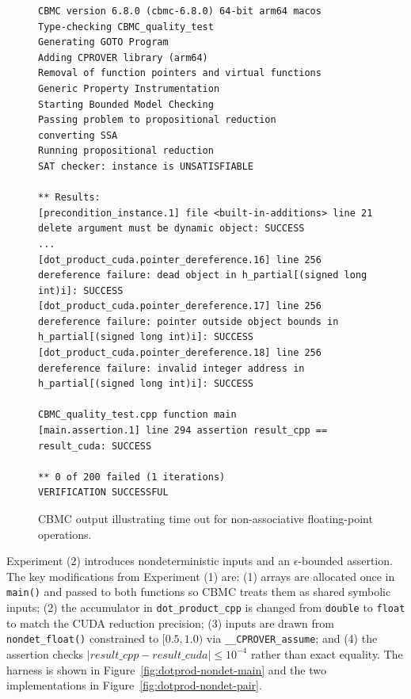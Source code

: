 \documentclass{article}
\begin{document}
\begin{figure}[H]
\begin{verbatim}
CBMC version 6.8.0 (cbmc-6.8.0) 64-bit arm64 macos
Type-checking CBMC_quality_test
Generating GOTO Program
Adding CPROVER library (arm64)
Removal of function pointers and virtual functions
Generic Property Instrumentation
Starting Bounded Model Checking
Passing problem to propositional reduction
converting SSA
Running propositional reduction
SAT checker: instance is UNSATISFIABLE

** Results:
[precondition_instance.1] file <built-in-additions> line 21 delete argument must be dynamic object: SUCCESS
...
[dot_product_cuda.pointer_dereference.16] line 256 dereference failure: dead object in h_partial[(signed long int)i]: SUCCESS
[dot_product_cuda.pointer_dereference.17] line 256 dereference failure: pointer outside object bounds in h_partial[(signed long int)i]: SUCCESS
[dot_product_cuda.pointer_dereference.18] line 256 dereference failure: invalid integer address in h_partial[(signed long int)i]: SUCCESS

CBMC_quality_test.cpp function main
[main.assertion.1] line 294 assertion result_cpp == result_cuda: SUCCESS

** 0 of 200 failed (1 iterations)
VERIFICATION SUCCESSFUL
\end{verbatim}
\caption{CBMC output illustrating time out for non-associative floating-point operations.}
\label{fig:cbmc-dotprod-nondet-output}
\end{figure}

Experiment (2) introduces nondeterministic inputs and an $\epsilon$-bounded assertion. The key modifications from Experiment (1) are: (1) arrays are allocated once in \texttt{main()} and passed to both functions so CBMC treats them as shared symbolic inputs; (2) the accumulator in \texttt{dot\_product\_cpp} is changed from \texttt{double} to \texttt{float} to match the CUDA reduction precision; (3) inputs are drawn from \texttt{nondet\_float()} constrained to $[0.5, 1.0)$ via \texttt{\_\_CPROVER\_assume}; and (4) the assertion checks $|result\_cpp - result\_cuda| \leq 10^{-4}$ rather than exact equality. The harness is shown in Figure~\ref{fig:dotprod-nondet-main} and the two implementations in Figure~\ref{fig:dotprod-nondet-pair}.
\end{document}
